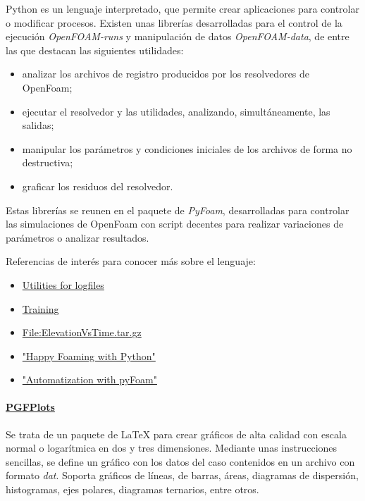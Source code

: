Python es un lenguaje interpretado, que permite crear aplicaciones para
controlar o modificar procesos. Existen unas librerías desarrolladas
para el control de la ejecución \emph{OpenFOAM-runs} y manipulación de
datos \emph{OpenFOAM-data}, de entre las que destacan las siguientes
utilidades:

\begin{itemize}
\item
  analizar los archivos de registro producidos por los resolvedores de
  OpenFoam;
\item
  ejecutar el resolvedor y las utilidades, analizando, simultáneamente,
  las salidas;
\item
  manipular los parámetros y condiciones iniciales de los archivos de
  forma no destructiva;
\item
  graficar los residuos del resolvedor.
\end{itemize}

Estas librerías se reunen en el paquete de \emph{PyFoam}, desarrolladas
para controlar las simulaciones de OpenFoam con script decentes para
realizar variaciones de parámetros o analizar resultados.

Referencias de interés para conocer más sobre el lenguaje:

\begin{itemize}
\item
  \href{https://openfoamwiki.net/index.php/Contrib/PyFoam\#Utilities_for_Logfiles}{Utilities
  for logfiles}
\item
  \href{http://www.learnpython.org/es/}{Training}
\item
  \href{https://openfoamwiki.net/index.php/File:ElevationVsTime.tar.gz}{File:ElevationVsTime.tar.gz}
\item
  \href{https://openfoamwiki.net/images/d/de/HappyFoamingWithPyFoam.pdf}{"Happy
  Foaming with Python"}
\item
  \href{http://web.student.chalmers.se/groups/ofw5/Advanced_Training/pyFoamAdvanced.pdf}{"Automatization
  with pyFoam"}
\end{itemize}

\paragraph{\texorpdfstring{
\href{http://pgfplots.sourceforge.net/}{PGFPlots}}{PGFPlots}}\label{header-n362}

Se trata de un paquete de LaTeX para crear gráficos de alta calidad con
escala normal o logarítmica en dos y tres dimensiones. Mediante unas
instrucciones sencillas, se define un gráfico con los datos del caso
contenidos en un archivo con formato \emph{dat}. Soporta gráficos de
líneas, de barras, áreas, diagramas de dispersión, histogramas, ejes
polares, diagramas ternarios, entre otros.

